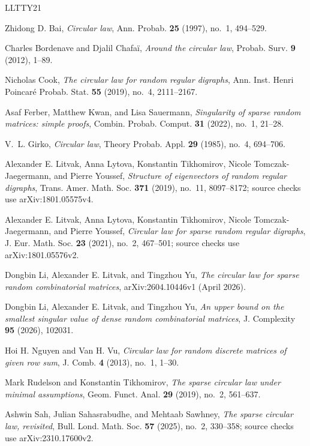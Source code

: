 \begin{thebibliography}{LLTTY21}

Zhidong D. Bai,
\emph{Circular law},
Ann. Probab. \textbf{25} (1997), no.~1, 494--529.

Charles Bordenave and Djalil Chafa\"i,
\emph{Around the circular law},
Probab. Surv. \textbf{9} (2012), 1--89.

Nicholas Cook,
\emph{The circular law for random regular digraphs},
Ann. Inst. Henri Poincar\'e Probab. Stat. \textbf{55} (2019), no.~4, 2111--2167.

Asaf Ferber, Matthew Kwan, and Lisa Sauermann,
\emph{Singularity of sparse random matrices: simple proofs},
Combin. Probab. Comput. \textbf{31} (2022), no.~1, 21--28.

V.~L. Girko,
\emph{Circular law},
Theory Probab. Appl. \textbf{29} (1985), no.~4, 694--706.

Alexander E. Litvak, Anna Lytova, Konstantin Tikhomirov,
Nicole Tomczak-Jaegermann, and Pierre Youssef,
\emph{Structure of eigenvectors of random regular digraphs},
Trans. Amer. Math. Soc. \textbf{371} (2019), no.~11, 8097--8172;
source checks use arXiv:1801.05575v4.

Alexander E. Litvak, Anna Lytova, Konstantin Tikhomirov,
Nicole Tomczak-Jaegermann, and Pierre Youssef,
\emph{Circular law for sparse random regular digraphs},
J. Eur. Math. Soc. \textbf{23} (2021), no.~2, 467--501;
source checks use arXiv:1801.05576v2.

Dongbin Li, Alexander E. Litvak, and Tingzhou Yu,
\emph{The circular law for sparse random combinatorial matrices},
arXiv:2604.10446v1 (April 2026).

Dongbin Li, Alexander E. Litvak, and Tingzhou Yu,
\emph{An upper bound on the smallest singular value of dense random combinatorial matrices},
J. Complexity \textbf{95} (2026), 102031.

Hoi H. Nguyen and Van H. Vu,
\emph{Circular law for random discrete matrices of given row sum},
J. Comb. \textbf{4} (2013), no.~1, 1--30.

Mark Rudelson and Konstantin Tikhomirov,
\emph{The sparse circular law under minimal assumptions},
Geom. Funct. Anal. \textbf{29} (2019), no.~2, 561--637.

Ashwin Sah, Julian Sahasrabudhe, and Mehtaab Sawhney,
\emph{The sparse circular law, revisited},
Bull. Lond. Math. Soc. \textbf{57} (2025), no.~2, 330--358;
source checks use arXiv:2310.17600v2.


\end{thebibliography}
